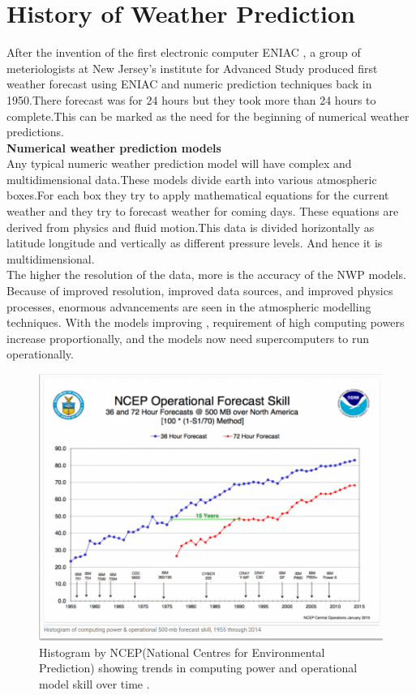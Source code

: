 \documentclass[sigconf]{acmart}
\begin{document}
\section{History of Weather Prediction}


After the invention of the first electronic computer ENIAC , a group of meteriologists at New Jersey's institute for Advanced Study produced first weather forecast using ENIAC and numeric prediction techniques back in 1950.There forecast was for 24 hours but they took more than 24 hours to complete.This can be marked as the need for the beginning of numerical weather predictions\cite{History01}.
\\

\textbf{Numerical weather prediction models}\\


Any typical numeric weather prediction model will have complex and multidimensional data.These models divide earth into various atmospheric boxes.For each box they try to apply mathematical equations for the current weather and they try to forecast weather for coming days. These equations are derived from physics and fluid motion.This data is divided horizontally as latitude longitude and vertically as different pressure levels. And hence it is multidimensional.\\

The higher the resolution of the data, more is the accuracy of the NWP models. Because of improved resolution, improved data sources, and improved physics processes, enormous advancements  are seen in the atmospheric modelling techniques. With the models improving , requirement of high computing powers increase proportionally, and the models now need supercomputers to run operationally.\\


\begin{figure}
\includegraphics{images/Big data image.PNG}
\caption{Histogram by NCEP(National Centres for Environmental Prediction) showing trends in computing power and operational model skill over time \cite{History01}.}
\end{figure}
\end{document}
